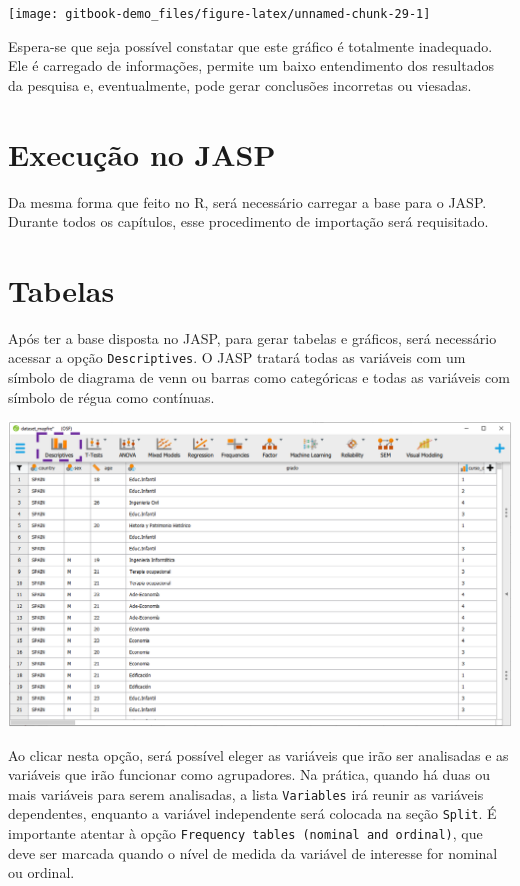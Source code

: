 \documentclass[
]{book}
\begin{document}
\begin{center}\texttt{[image: gitbook-demo\_files/figure-latex/unnamed-chunk-29-1]} \end{center}

Espera-se que seja possível constatar que este gráfico é totalmente inadequado. Ele é carregado de informações, permite um baixo entendimento dos resultados da pesquisa e, eventualmente, pode gerar conclusões incorretas ou viesadas.

\hypertarget{execuuxe7uxe3o-no-jasp}{%
\section{Execução no JASP}\label{execuuxe7uxe3o-no-jasp}}

Da mesma forma que feito no R, será necessário carregar a base para o JASP. Durante todos os capítulos, esse procedimento de importação será requisitado.

\hypertarget{tabelas-1}{%
\section{Tabelas}\label{tabelas-1}}

Após ter a base disposta no JASP, para gerar tabelas e gráficos, será necessário acessar a opção \texttt{Descriptives}. O JASP tratará todas as variáveis com um símbolo de diagrama de venn ou barras como categóricas e todas as variáveis com símbolo de régua como contínuas.

\includegraphics{./img/cap_desc_jasp_descritivo.png}

Ao clicar nesta opção, será possível eleger as variáveis que irão ser analisadas e as variáveis que irão funcionar como agrupadores. Na prática, quando há duas ou mais variáveis para serem analisadas, a lista \texttt{Variables} irá reunir as variáveis dependentes, enquanto a variável independente será colocada na seção \texttt{Split}. É importante atentar à opção \texttt{Frequency\ tables\ (nominal\ and\ ordinal)}, que deve ser marcada quando o nível de medida da variável de interesse for nominal ou ordinal.
\end{document}
